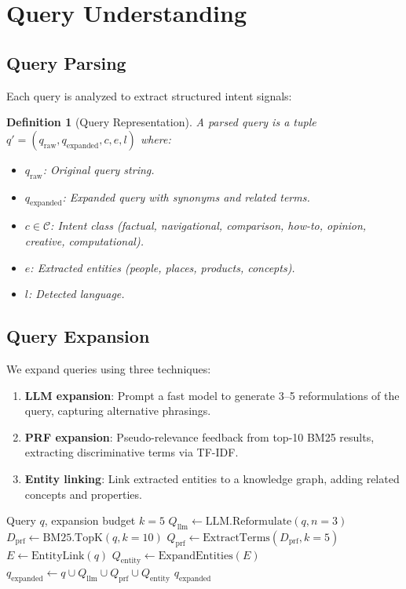 \documentclass[11pt,twocolumn]{article}
\newtheorem{definition}{Definition}
\begin{document}
\section{Query Understanding}
\label{sec:query}

\subsection{Query Parsing}

Each query is analyzed to extract structured intent signals:

\begin{definition}[Query Representation]
A parsed query is a tuple $q' = (q_{\text{raw}}, q_{\text{expanded}}, c, e, l)$ where:
\begin{itemize}[leftmargin=1.1em]
    \item $q_{\text{raw}}$: Original query string.
    \item $q_{\text{expanded}}$: Expanded query with synonyms and related terms.
    \item $c \in \mathcal{C}$: Intent class (factual, navigational, comparison, how-to, opinion, creative, computational).
    \item $e$: Extracted entities (people, places, products, concepts).
    \item $l$: Detected language.
\end{itemize}
\end{definition}

\subsection{Query Expansion}

We expand queries using three techniques:

\begin{enumerate}[leftmargin=1.4em]
    \item \textbf{LLM expansion}: Prompt a fast model to generate 3--5 reformulations of the query, capturing alternative phrasings.
    \item \textbf{PRF expansion}: Pseudo-relevance feedback from top-10 BM25 results, extracting discriminative terms via TF-IDF.
    \item \textbf{Entity linking}: Link extracted entities to a knowledge graph, adding related concepts and properties.
\end{enumerate}

\begin{algorithm}[H]
\caption{Multi-Strategy Query Expansion}
\label{alg:expansion}
\begin{algorithmic}[1]
\Require Query $q$, expansion budget $k = 5$
\State $Q_{\text{llm}} \gets \text{LLM.Reformulate}(q, n=3)$
\State $D_{\text{prf}} \gets \text{BM25.TopK}(q, k=10)$
\State $Q_{\text{prf}} \gets \text{ExtractTerms}(D_{\text{prf}}, k=5)$
\State $E \gets \text{EntityLink}(q)$
\State $Q_{\text{entity}} \gets \text{ExpandEntities}(E)$
\State $q_{\text{expanded}} \gets q \cup Q_{\text{llm}} \cup Q_{\text{prf}} \cup Q_{\text{entity}}$
\State \Return $q_{\text{expanded}}$
\end{algorithmic}
\end{algorithm}
\end{document}
